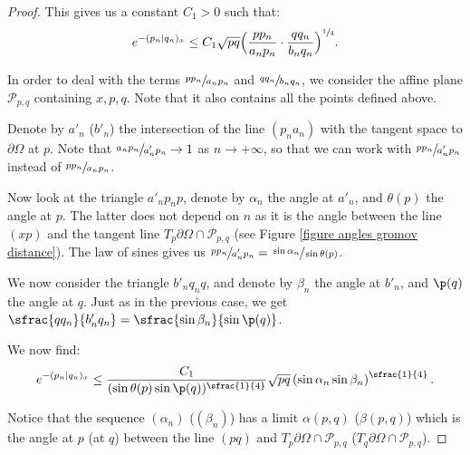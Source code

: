 \begin{proof}
This gives us a constant $C_1>0$ such that:
\[ e^{-(p_n\vert q_n)_x} \leq C_1 \sqrt{pq} \Bigl( \frac{pp_n}{a_np_n}\cdot \frac{qq_n}{b_nq_n}\Bigr)^{\sfrac{1}{4}}. \]

In order to deal with the terms $\sfrac{pp_n}{a_np_n}$ and $\sfrac{qq_n}{b_nq_n}$, we consider the affine plane $\mathcal P_{p,q}$ containing $x,p,q$. Note that it also contains all the points defined above.

Denote by $a'_n$ (\resp $b'_n$) the intersection of the line $(p_na_n)$ with the tangent space to $\partial \Omega$ at $p$. Note that $\sfrac{a_np_n}{a'_np_n}\to 1$ as $n\to +\infty$, so that we can work with $\sfrac{pp_n}{a'_np_n}$ instead of $\sfrac{pp_n}{a_np_n}$.

Now look at the triangle $a'_np_np$, denote by $\alpha_n$ the angle at $a'_n$, and $\theta(p)$ the angle at $p$. The latter does not depend on $n$ as it is the angle between the line $(xp)$ and the tangent line $T_p\partial\Omega \cap \mathcal P_{p,q}$ (see Figure \ref{figure angles gromov distance}). The law of sines gives us $\sfrac{pp_n}{a'_np_n}=\sfrac{\sin \alpha_n}{\sin \theta(p)}$.

We now consider the triangle $b'_nq_nq$, and denote by $\beta_n$ the angle at $b'_n$, and $\p(q)$ the angle at $q$. Just as in the previous case, we get $\sfrac{qq_n}{b'_nq_n}=\sfrac{\sin \beta_n}{\sin\p(q)}$.

We now find:
\[ e^{-(p_n\vert q_n)_x} \leq \frac{C_1}{(\sin \theta(p) \sin \p(q))^{\sfrac{1}{4}}} \sqrt{pq} \left( \sin \alpha_n \sin \beta_n \right)^{\sfrac{1}{4}}. \]

Notice that the sequence $(\alpha_n)$ (\resp $(\beta_n)$) has a limit $\alpha(p,q)$ (\resp $\beta(p,q)$) which is the angle at $p$ (\resp at $q$) between the line $(pq)$ and $T_p\partial\Omega \cap \mathcal P_{p,q}$ (\resp $T_q\partial\Omega \cap \mathcal P_{p,q}$).


\end{proof}
